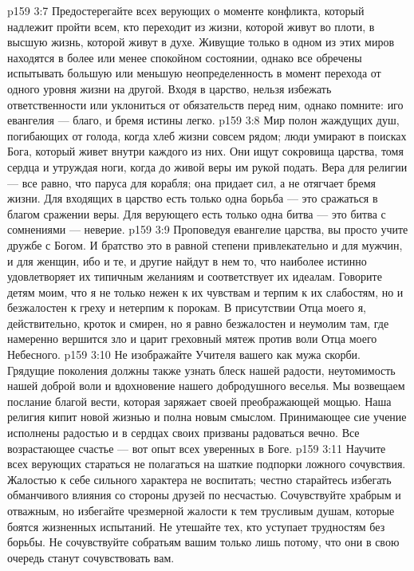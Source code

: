 \vs p159 3:7 Предостерегайте всех верующих о моменте конфликта, который надлежит пройти всем, кто переходит из жизни, которой живут во плоти, в высшую жизнь, которой живут в духе. Живущие только в одном из этих миров находятся в более или менее спокойном состоянии, однако все обречены испытывать большую или меньшую неопределенность в момент перехода от одного уровня жизни на другой. Входя в царство, нельзя избежать ответственности или уклониться от обязательств перед ним, однако помните: иго евангелия --- благо, и бремя истины легко.
\vs p159 3:8 Мир полон жаждущих душ, погибающих от голода, когда хлеб жизни совсем рядом; люди умирают в поисках Бога, который живет внутри каждого из них. Они ищут сокровища царства, томя сердца и утруждая ноги, когда до живой веры им рукой подать. Вера для религии --- все равно, что паруса для корабля; она придает сил, а не отягчает бремя жизни. Для входящих в царство есть только одна борьба --- это сражаться в благом сражении веры. Для верующего есть только одна битва --- это битва с сомнениями --- неверие.
\vs p159 3:9 Проповедуя евангелие царства, вы просто учите дружбе с Богом. И братство это в равной степени привлекательно и для мужчин, и для женщин, ибо и те, и другие найдут в нем то, что наиболее истинно удовлетворяет их типичным желаниям и соответствует их идеалам. Говорите детям моим, что я не только нежен к их чувствам и терпим к их слабостям, но и безжалостен к греху и нетерпим к порокам. В присутствии Отца моего я, действительно, кроток и смирен, но я равно безжалостен и неумолим там, где намеренно вершится зло и царит греховный мятеж против воли Отца моего Небесного.
\vs p159 3:10 Не изображайте Учителя вашего как мужа скорби. Грядущие поколения должны также узнать блеск нашей радости, неутомимость нашей доброй воли и вдохновение нашего добродушного веселья. Мы возвещаем послание благой вести, которая заряжает своей преображающей мощью. Наша религия кипит новой жизнью и полна новым смыслом. Принимающее сие учение исполнены радостью и в сердцах своих призваны радоваться вечно. Все возрастающее счастье --- вот опыт всех уверенных в Боге.
\vs p159 3:11 Научите всех верующих стараться не полагаться на шаткие подпорки ложного сочувствия. Жалостью к себе сильного характера не воспитать; честно старайтесь избегать обманчивого влияния со стороны друзей по несчастью. Сочувствуйте храбрым и отважным, но избегайте чрезмерной жалости к тем трусливым душам, которые боятся жизненных испытаний. Не утешайте тех, кто уступает трудностям без борьбы. Не сочувствуйте собратьям вашим только лишь потому, что они в свою очередь станут сочувствовать вам.
